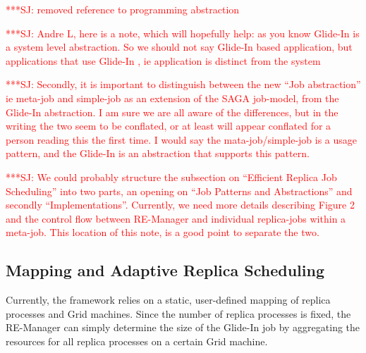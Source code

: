 \documentclass{rspublic}
\newcommand{\jhanote}[1]{ {\textcolor{red} { ***SJ: #1 }}}
\newcommand{\jhanote}[1]{}
\newcommand{\glidein}[1]{Glide-In }
\newcommand{\remanager}[1]{RE-Manager }
\begin{document}
\jhanote{removed reference to programming abstraction}

\jhanote{Andre L, here is a note, which will hopefully help: as you
  know \glidein\ is a system level abstraction. So we should not say
  \glidein\ based application, but applications that use \glidein\ ,
  ie application is distinct from the system}

\jhanote{Secondly, it is important to distinguish between the new
  ``Job abstraction'' ie meta-job and simple-job as an extension of
  the SAGA job-model, from the \glidein\ abstraction. I am sure we are
  all aware of the differences, but in the writing the two seem to be
  conflated, or at least will appear conflated for a person reading
  this the first time. I would say the mata-job/simple-job is a usage
  pattern, and the \glidein\ is an abstraction that supports this
  pattern.}

\jhanote{We could probably structure the subsection on ``Efficient
  Replica Job Scheduling'' into two parts, an opening on ``Job
  Patterns and Abstractions'' and secondly
  ``Implementations''. Currently, we need more details describing
  Figure 2 and the control flow between \remanager\ and individual
  replica-jobs within a meta-job. This location of this note, is a
  good point to separate the two.}    

\subsection{Mapping and Adaptive Replica Scheduling}

Currently, the framework relies on a static, user-defined 
mapping of replica processes and Grid machines.
Since the number of replica processes is fixed, the RE-Manager can
simply determine the size of the Glide-In job by aggregating 
the resources for all replica processes on a certain Grid machine.
\end{document}
